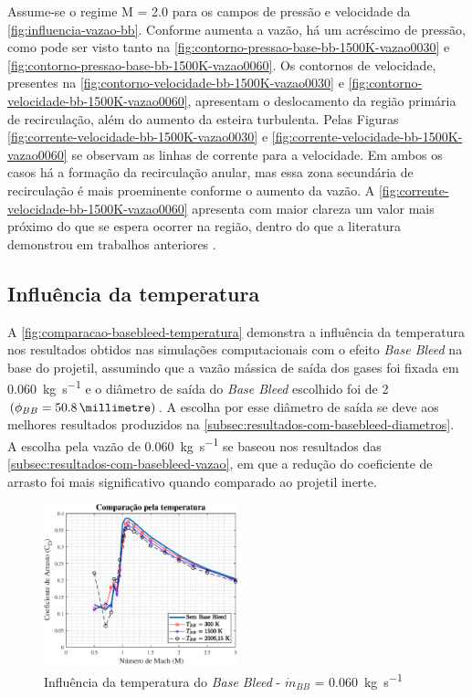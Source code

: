 Assume-se o regime M = \num{2,0} para os campos de pressão e velocidade da \autoref{fig:influencia-vazao-bb}. Conforme aumenta a vazão, há um acréscimo de pressão, como pode ser visto tanto na \autoref{fig:contorno-pressao-base-bb-1500K-vazao0030} e \autoref{fig:contorno-pressao-base-bb-1500K-vazao0060}. Os contornos de velocidade, presentes na \autoref{fig:contorno-velocidade-bb-1500K-vazao0030} e \autoref{fig:contorno-velocidade-bb-1500K-vazao0060}, apresentam o deslocamento da região primária de recirculação, além do aumento da esteira turbulenta. Pelas Figuras \ref{fig:corrente-velocidade-bb-1500K-vazao0030} e \ref{fig:corrente-velocidade-bb-1500K-vazao0060} se observam as linhas de corrente para a velocidade. Em ambos os casos há a formação da recirculação anular, mas essa zona secundária de recirculação é mais proeminente conforme o aumento da vazão. A \autoref{fig:corrente-velocidade-bb-1500K-vazao0060} apresenta com maior clareza um valor mais próximo do que se espera ocorrer na região, dentro do que a literatura demonstrou em trabalhos anteriores \cite{Sahu1985,Andersson1976}.

\subsection{Influência da temperatura}

A \autoref{fig:comparacao-basebleed-temperatura} demonstra a influência da temperatura nos resultados obtidos nas simulações computacionais com o efeito \textit{Base Bleed} na base do projetil, assumindo que a vazão mássica de saída dos gases foi fixada em \qty{0,060}{\kilogram\per\second} e o diâmetro de saída do \textit{Base Bleed} escolhido foi de \qty{2}{\polegada} \(\left(\phi_{BB} = \qty{50,8}{\millimetre}\right)\). A escolha por esse diâmetro de saída se deve aos melhores resultados produzidos na \autoref{subsec:resultados-com-basebleed-diametros}. A escolha pela vazão de \qty{0,060}{\kilogram\per\second} se baseou nos resultados das \autoref{subsec:resultados-com-basebleed-vazao}, em que a redução do coeficiente de arrasto foi mais significativo quando comparado ao projetil inerte.

\begin{figure}[!ht]
	\centering
	\includegraphics[width=0.5\textwidth]{cd-combasebleed-vazao006-2pol.eps}
	\caption{Influência da temperatura do \textit{Base Bleed} - \(\Dot{m}_{BB}\) = \qty{0,060}{\kilogram\per\second}}
	\label{fig:comparacao-basebleed-temperatura}
\end{figure}

